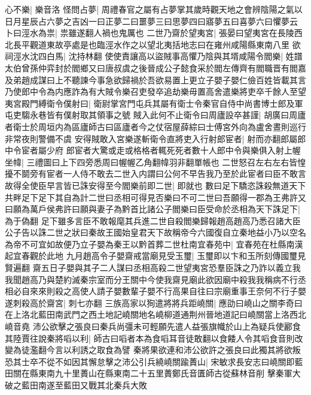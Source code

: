 心不樂|{
	樂音洛}
怪問占夢|{
	周禮春官之屬有占夢掌其歲時觀天地之會辨陰陽之氣以日月星辰占六夢之吉凶一曰正夢二曰噩夢三曰思夢四曰寤夢五曰喜夢六曰懼夢云}
卜曰涇水為祟|{
	祟雖遂翻人禍也鬼厲也}
二世乃齋於望夷宮|{
	張晏曰望夷宮在長陵西北長平觀道東故亭處是也臨涇水作之以望北夷括地志曰在雍州咸陽縣東南八里}
欲祠涇水沈四白馬|{
	沈持林翻}
使使責讓高以盜賊事高懼乃陰與其壻咸陽令閻樂|{
	姓譜太伯曾孫仲弈封於閻鄉又曰唐叔虞之後晉成公子懿食采於閻左傳齊有閻職晋有閻嘉}
及弟趙成謀曰上不聽諫今事急欲歸禍於吾欲易置上更立子嬰子嬰仁儉百姓皆載其言乃使郎中令為内應詐為有大賊令樂召吏發卒追劫樂毋置高舍遣樂將吏卒千餘人至望夷宮殿門縛衛令僕射曰|{
	衛尉掌宮門屯兵其屬有衛士令秦官自侍中尚書博士郎及軍屯吏騶永巷皆有僕射取其領事之號}
賊入此何不止衛令曰周廬設卒甚謹|{
	胡廣曰周廬者衛士於周垣内為區廬師古曰區廬者今之仗宿屋薛綜曰士傅宮外向為盧舍晝則巡行非常夜則警備不虞}
安得賊敢入宮樂遂斬衛令直將吏入行射郎宦者|{
	射而亦翻郎屬郎中令宦者屬少府}
郎宦者大驚或走或格格者輒死死者數十人郎中令與樂俱入射上幄坐幃|{
	三禮圖曰上下四旁悉周曰幄幄乙角翻幃羽非翻單帳也}
二世怒召左右左右皆惶擾不鬬旁有宦者一人侍不敢去二世入内謂曰公何不早告我乃至於此宦者曰臣不敢言故得全使臣早言皆已誅安得至今閻樂前即二世|{
	即就也}
數曰足下驕恣誅殺無道天下共畔足下足下其自為計二世曰丞相可得見否樂曰不可二世曰吾願得一郡為王弗許又曰願為萬戶侯弗許曰願與妻子為黔首比諸公子閻樂曰臣受命於丞相為天下誅足下|{
	為于偽翻}
足下雖多言臣不敢報麾其兵進二世自殺閻樂歸報趙高趙高乃悉召諸大臣公子告以誅二世之狀曰秦故王國始皇君天下故稱帝今六國復自立秦地益小乃以空名為帝不可宜如故便乃立子嬰為秦王以黔首葬二世杜南宜春苑中|{
	宜春苑在杜縣南漢起宜春觀於此地}
九月趙高令子嬰齋戒當廟見受玉璽|{
	玉璽即以卞和玉所刻傳國璽見賢遍翻}
齋五日子嬰與其子二人謀曰丞相高殺二世望夷宮恐羣臣誅之乃詐以義立我我聞趙高乃與楚約滅秦宗室而分王關中今使我齋見廟此欲因廟中殺我我稱病不行丞相必自來來則殺之高使人請子嬰數輩子嬰不行高果自往曰宗廟重事王奈何不行子嬰遂刺殺高於齋宮|{
	刺七亦翻}
三族高家以狥遣將將兵距嶢關|{
	應劭曰嶢山之關李奇曰在上洛北藍田南武門之西土地記嶢關地名嶢柳道通荆州晉地道記曰嶢關當上洛西北嶢音堯}
沛公欲擊之張良曰秦兵尚彊未可輕願先遣人益張旗幟於山上為疑兵使酈食其陸賈往說秦將㗖以利|{
	師古曰㗖者本為食㗖耳音徒敢翻以食餧人令其㗖食音則改變為徒濫翻今言以利誘之取食為譬}
秦將果欲連和沛公欲許之張良曰此獨其將欲叛恐其士卒不從不如因其懈怠擊之沛公引兵繞嶢關踰蕢山|{
	宋敏求長安志曰嶢關即藍田關在縣東南九十里蕢山在縣東南二十五里蕢鄭氏音匱師古從蘇林音削}
擊秦軍大破之藍田南遂至藍田又戰其北秦兵大敗

